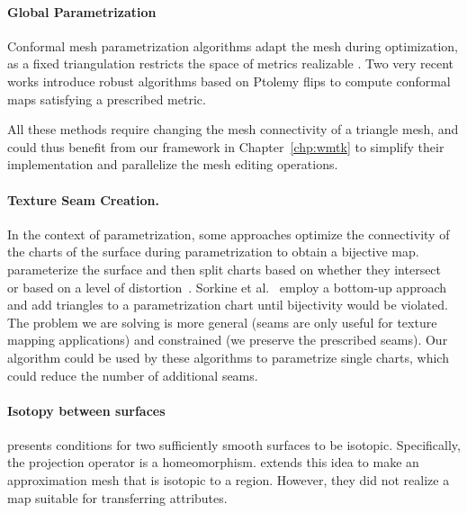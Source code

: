\paragraph{Global Parametrization} 

Conformal mesh parametrization algorithms adapt the mesh during optimization, as a fixed triangulation restricts the space of metrics realizable \cite{luo2004combinatorial,Campen:2017:SimilarityMaps,campen2018seamless,gu2018discrete,gu2018discrete2,springborn2019ideal,sun2015discrete}. Two very recent works \cite{Gillespie:2021:DCE,Campen:2021} introduce robust algorithms based on Ptolemy flips to compute conformal maps satisfying a prescribed metric.

All these methods require changing the mesh connectivity of a triangle mesh, and could thus benefit from our framework in Chapter~\ref{chp:wmtk} to simplify their implementation and parallelize the mesh editing operations. 

\paragraph{Texture Seam Creation.}
In the context of parametrization, some approaches optimize the connectivity of the charts of the surface during parametrization to obtain a bijective map.  \cite{Levy:2002,Zhou:2004} parameterize the surface and then split charts based on whether they intersect~\cite{Levy:2002} or based on a level of distortion~\cite{Zhou:2004}.  Sorkine et al.~\cite{Sorkine:2002} employ a bottom-up approach and add triangles to a parametrization chart until bijectivity would be violated. The problem we are solving is more general (seams are only useful for texture mapping applications) and constrained (we preserve the prescribed seams). Our algorithm could be used by these algorithms to parametrize single charts, which could reduce the number of additional seams.


\paragraph{Isotopy between surfaces}

{\cite{chazal2005condition,chazal2010ball}} presents conditions for two {sufficiently} smooth surfaces {to be isotopic. Specifically, the projection operator is a homeomorphism.} \cite{mandad2015isotopic} extends this idea to make an approximation mesh that is isotopic to a region. However, they {did} not realize a map suitable for {transferring attributes}.


